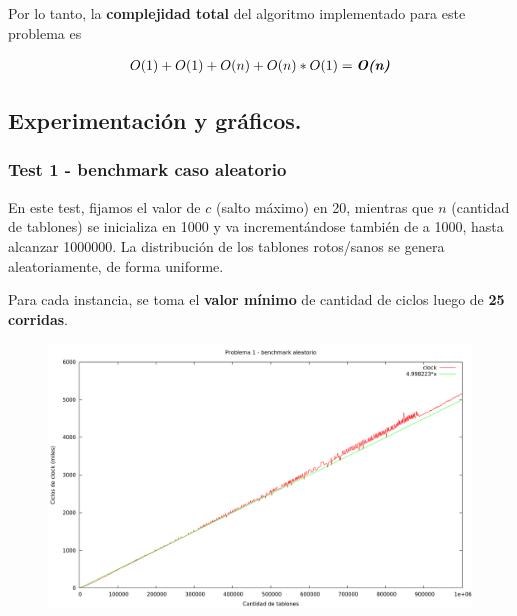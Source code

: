Por lo tanto, la \textbf{complejidad total} del algoritmo implementado para este problema es

\begin{align*}
  O(1) + O(1) + O(n) + O(n)*O(1) = \textit{\textbf{O(n)}}
\end{align*}



\subsection{Experimentación y gráficos.}

\vspace*{0.3cm}

\subsubsection{Test 1 - benchmark caso aleatorio}

En este test, fijamos el valor de $c$ (salto máximo) en 20, mientras que $n$ (cantidad de tablones) 
se inicializa en 1000 y va incrementándose también de a 1000, hasta alcanzar 1000000. La 
distribución de los tablones rotos/sanos se genera aleatoriamente, de forma uniforme.
 
Para cada instancia, se toma el \textbf{valor mínimo} de cantidad de ciclos luego de \textbf{25 corridas}. 

\vspace*{0.5cm}

\begin{figure}[h]
  \begin{center}
    \includegraphics[scale=0.35]{imagenes/grafico-1.png}
  \end{center}
\end{figure}

